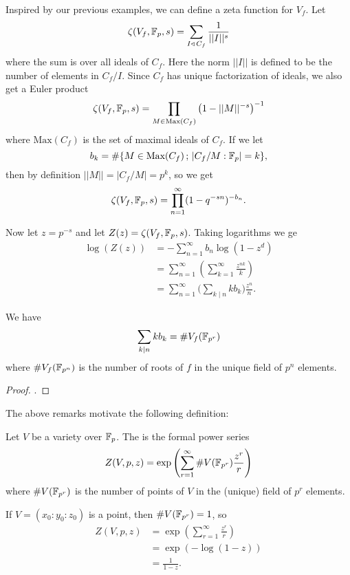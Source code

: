 \documentclass[12pt, a4paper]{report}
\begin{document}
Inspired by our previous examples, we can define a zeta function for $V_f$. Let
\[\zeta(V_f, \mathbb{F}_p, s) = \sum\limits_{I \triangleleft \, C_f} \frac{1}{||I||^s}
\]
where the sum is over all ideals of $C_f$. Here the norm $||I||$ is defined to
be the number of elements in $C_f / I$. Since $C_f$ has unique factorization
of ideals, we also get a Euler product 
\[\zeta(V_f, \mathbb{F}_p, s) = \prod\limits_{M \in \text{Max}(C_f)} \left( 1 - ||M||^{-s} \right)^{-1}\]
where $\text{Max}(C_f)$ is the set of maximal ideals of $C_f$.
If we let
\[b_k = \# \{M \in \text{Max}(C_f) \, ; \, |C_f/M : \mathbb{F}_p| = k\},\]
then by definition $||M|| = |C_f/M| = p^k$, so we get
\[\zeta(V_f, \mathbb{F}_p, s) = \prod\limits_{n=1}^\infty (1 - q^{-sn})^{-b_n}.\]

Now let $z = p^{-s}$ and let $Z(z) = \zeta(V_f, \mathbb{F}_p, s)$. Taking logarithms
we ge
\begin{equation*}
  \begin{split}
    \log (Z(z)) &= - \sum\limits_{n=1}^\infty b_n \log(1-z^d) \\
    &= \sum\limits_{n=1}^\infty \left( \sum\limits_{k=1}^\infty \frac{z^{nk}}{k} \right) \\
    &= \sum\limits_{n=1}^\infty \big( \sum\limits_{k \mid n} kb_k \big) \frac{z^n}{n} .
  \end{split}
\end{equation*}

\begin{prop}
  We have
  \[\sum\limits_{k \mid n} kb_k = \# V_f(\mathbb{F}_{p^r})\]
  where $\# V_f(\mathbb{F}_{p^n})$ is the number of roots of $f$ in the unique field of
  $p^n$ elements.
\end{prop}
\begin{proof}
  \cite[See][Proposition VII-3.5, page 232]{lorenzini}.
\end{proof}

The above remarks motivate the following definition:

\begin{defn}
  Let $V$ be a variety over $\mathbb{F}_p$.
  The  is the formal power series
  \begin{equation} \label{zeta_defn}
    Z(V, p, z) = \exp \left( \sum\limits_{r=1}^{\infty} \# V(\mathbb{F}_{p^r}) \frac{z^r}{r} \right)
  \end{equation}
  where $\# V(\mathbb{F}_{p^r})$ is the number of points of $V$ in the (unique) field
  of $p^r$ elements.
\end{defn}

\begin{example}[Point]
  If $V = (x_0:y_0:z_0)$ is a point, then $\#V(\mathbb{F}_{p^r}) = 1$, so
  \begin{equation*}
    \begin{split}
      Z(V,p,z) &= \exp \left( \sum\limits_{r=1}^{\infty} \frac{z^r}{r} \right) \\
               &= \exp (-\log (1-z)) \\
               &= \frac{1}{1-z}.
    \end{split}
  \end{equation*}
             
\end{example}
\end{document}
